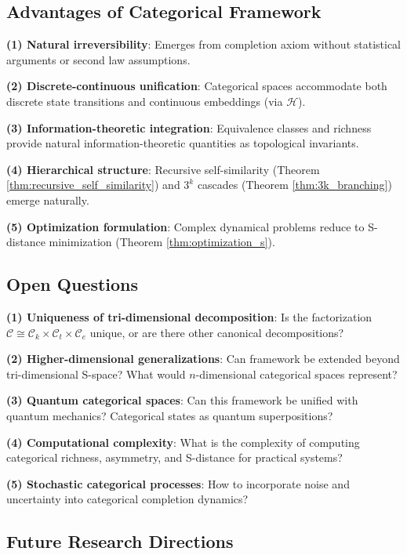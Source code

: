 \documentclass[12pt,a4paper]{article}
\begin{document}
\subsection{Advantages of Categorical Framework}

\textbf{(1) Natural irreversibility}: Emerges from completion axiom without statistical arguments or second law assumptions.

\textbf{(2) Discrete-continuous unification}: Categorical spaces accommodate both discrete state transitions and continuous embeddings (via $\mathcal{H}$).

\textbf{(3) Information-theoretic integration}: Equivalence classes and richness provide natural information-theoretic quantities as topological invariants.

\textbf{(4) Hierarchical structure}: Recursive self-similarity (Theorem \ref{thm:recursive_self_similarity}) and $3^k$ cascades (Theorem \ref{thm:3k_branching}) emerge naturally.

\textbf{(5) Optimization formulation}: Complex dynamical problems reduce to S-distance minimization (Theorem \ref{thm:optimization_s}).

\subsection{Open Questions}

\textbf{(1) Uniqueness of tri-dimensional decomposition}: Is the factorization $\mathcal{C} \cong \mathcal{C}_k \times \mathcal{C}_t \times \mathcal{C}_e$ unique, or are there other canonical decompositions?

\textbf{(2) Higher-dimensional generalizations}: Can framework be extended beyond tri-dimensional S-space? What would $n$-dimensional categorical spaces represent?

\textbf{(3) Quantum categorical spaces}: Can this framework be unified with quantum mechanics? Categorical states as quantum superpositions?

\textbf{(4) Computational complexity}: What is the complexity of computing categorical richness, asymmetry, and S-distance for practical systems?

\textbf{(5) Stochastic categorical processes}: How to incorporate noise and uncertainty into categorical completion dynamics?

\subsection{Future Research Directions}
\end{document}

